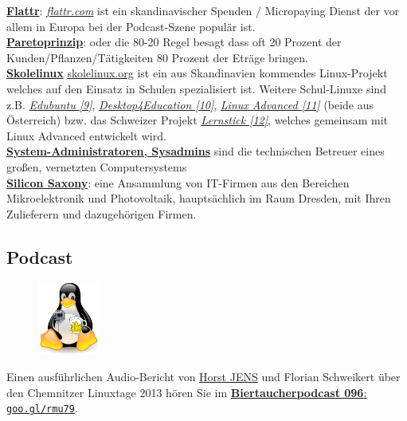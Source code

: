 \documentclass[10pt,a4paper,ngerman,twoside]{article} %
\begin{document}
\begin{multicols}{3}
\href{http://flattr.com}{\textbf{Flattr}}: \href{http://flattr.com}{\textit{flattr.com}} ist ein skandinavischer Spenden / Micropaying Dienst der vor allem in Europa bei der Podcast-Szene populär ist. \\

\href{http://de.wikipedia.org/wiki/Paretoprinzip}{\textbf{Paretoprinzip}}: oder die 80-20 Regel besagt dass oft 20 Prozent der Kunden/Pflanzen/Tätigkeiten 80 Prozent der Eträge bringen. \\

\href{http://www.skolelinux.org/}{\textbf{Skolelinux}} \href{http://skolelinux.org/}{skolelinux.org} ist ein aus Skandinavien kommendes Linux-Projekt welches auf den Einsatz in Schulen spezialisiert ist. Weitere Schul-Linuxe sind z.B. \href{http://www.edubuntu.org/}{\textit{Edubuntu [9]}}, \href{http://d4e.at/}{\textit{Desktop4Education [10]}}, \href{http://www.linuxadvanced.at/}{\textit{Linux Advanced [11]}} (beide aus Österreich) bzw. das Schweizer Projekt \href{http://www.imedias.ch/lernstick}{\textit{Lernstick [12]}}, welches gemeinsam mit Linux Advanced entwickelt wird. \\


\href{http://de.wikipedia.org/wiki/Systemadministrator}{\textbf{System-Administratoren, Sysadmins}} sind die technischen Betreuer eines großen, vernetzten Computersystems\\

\href{http://de.wikipedia.org/wiki/Silicon_Saxony}{\textbf{Silicon Saxony}}: eine Ansammlung von IT-Firmen aus den Bereichen Mikroelektronik und Photovoltaik, hauptsächlich im Raum Dresden, mit Ihren Zulieferern und dazugehörigen Firmen.

\subsection*{Podcast}
\begin{figure}
\includegraphics[width=2cm]{chemnitz/chemnitz-biertaucherlogo.png}
\end{figure}
Einen ausführlichen Audio-Bericht von \href{http://spielend-programmieren.at}{Horst JENS} und Florian Schweikert über den Chemnitzer Linuxtage 2013  hören Sie im \href{http://spielend-programmieren.at/de:podcast:biertaucher:2013:096}{\textbf{Biertaucherpodcast 096}: \texttt{goo.gl/rmu79}}. 


\end{multicols}
\end{document}

